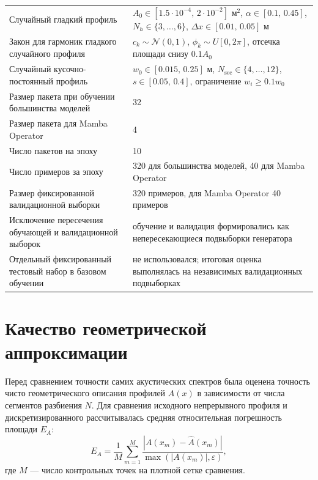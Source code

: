\begin{table}[H]
{\begin{tabular}{|l|l|}
        Случайный гладкий профиль & $A_0 \in [1.5 \cdot 10^{-4},\, 2 \cdot 10^{-2}]$ м$^2$, $\alpha \in [0.1,\, 0.45]$, $N_h \in \{3,\dots,6\}$, $\Delta x \in [0.01,\,0.05]$ м \\
        Закон для гармоник гладкого случайного профиля & $c_k \sim \mathcal{N}(0,1)$, $\phi_k \sim U[0,2\pi]$, отсечка площади снизу $0.1A_0$ \\
        Случайный кусочно-постоянный профиль & $w_0 \in [0.015,\,0.25]$ м, $N_\text{sec} \in \{4,\dots,12\}$, $s \in [0.05,\,0.4]$, ограничение $w_i \ge 0.1w_0$ \\
        Размер пакета при обучении большинства моделей & 32 \\
        Размер пакета для Mamba Operator & 4 \\
        Число пакетов на эпоху & 10 \\
        Число примеров за эпоху & 320 для большинства моделей, 40 для Mamba Operator \\
        Размер фиксированной валидационной выборки & 320 примеров, для Mamba Operator 40 примеров \\
        Исключение пересечения обучающей и валидационной выборок & обучение и валидация формировались как непересекающиеся подвыборки генератора \\
        Отдельный фиксированный тестовый набор в базовом обучении & не использовался; итоговая оценка выполнялась на независимых валидационных подвыборках \\
        \hline
    \end{tabular}%
    }
\end{table}

\section{Качество геометрической аппроксимации}
\label{sec:approximation_quality}

Перед сравнением точности самих акустических спектров была оценена точность чисто геометрического описания профилей $A(x)$ в зависимости от числа сегментов разбиения $N$. Для сравнения исходного непрерывного профиля и дискретизированного рассчитывалась средняя относительная погрешность площади $E_A$:
\begin{equation}
    E_A = \frac{1}{M} \sum_{m=1}^{M} \frac{|A(x_m) - \widehat{A}(x_m)|}{\max(|A(x_m)|, \varepsilon)},
\end{equation}
где $M$ --- число контрольных точек на плотной сетке сравнения.

